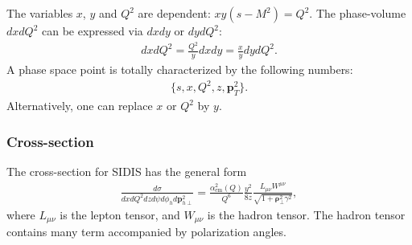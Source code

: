 \documentclass[prd,nofootinbib,eqsecnum,final]{revtex4}
\renewcommand{\(}{\left(}
\renewcommand{\)}{\right)}
\renewcommand{\[}{\left[}
\renewcommand{\]}{\right]}
\renewcommand{\vec}[1]{\bm{#1}}
\begin{document}
The variables $x$, $y$ and $Q^2$ are dependent: $xy(s-M^2)=Q^2$. The phase-volume $dxdQ^2$ can be expressed via $dxdy$ or $dydQ^2$:
\begin{eqnarray}
dxdQ^2= \frac{Q^2}{y}dxdy=\frac{x}{y}dydQ^2.
\end{eqnarray}
A phase space point is totally characterized by the following numbers:
\begin{eqnarray}
\{s,x,Q^2,z,\vec p_T^2\}.
\end{eqnarray}
Alternatively, one can replace $x$ or $Q^2$ by $y$.

\subsubsection{Cross-section}

The cross-section for SIDIS has the general form
\begin{eqnarray}
\frac{d\sigma}{dx dQ^2 dzd\psi d\phi_h d \vec p^2_{h\perp}}=\frac{\alpha_{\text{em}}^2(Q)}{Q^6}\frac{y^2}{8z}\frac{L_{\mu\nu}W^{\mu\nu}}{\sqrt{1+\vec \rho^2_\perp \gamma^2}},
\end{eqnarray}
where $L_{\mu\nu}$ is the lepton tensor, and $W_{\mu\nu}$ is the hadron tensor. The hadron tensor contains many term accompanied by polarization angles. 
\end{document}
